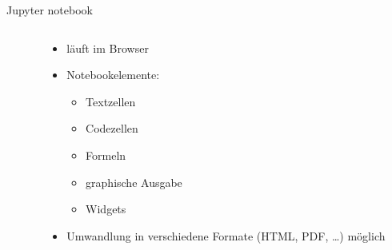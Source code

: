 \documentclass[t, utf8, 10pt]{beamer}
\begin{document}
\begin{frame}{Jupyter notebook}
\begin{columns}
\begin{column}{0.6\textwidth}
  \end{column}%
  \begin{column}{0.4\textwidth}
   \vspace{-8truecm}
   \begin{itemize}
    \item \small läuft im Browser
    \item \small Notebookelemente:
          \begin{itemize}
           \item<alert@2> Textzellen
           \item<alert@3> Codezellen
           \item<alert@4> Formeln
           \item<alert@5> graphische Ausgabe
           \item<alert@6> Widgets
          \end{itemize}
    \item \small Umwandlung in verschiedene Formate (HTML, PDF, \ldots) möglich
   \end{itemize}

   \vspace{1truecm}
   \begin{center}
    \begin{Large}
    \end{Large}
   \end{center}
  \end{column}
 \end{columns}
\end{frame}
\end{document}
